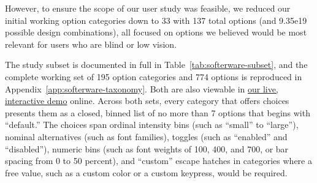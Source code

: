 \documentclass[12pt]{cmuthesis}
\begin{document}
However, to ensure the scope of our user study was feasible, we reduced our initial working option categories down to 33 with 137 total options (and 9.35e19 possible design combinations), all focused on options we believed would be most relevant for users who are blind or low vision.

The study subset is documented in full in Table~\ref{tab:softerware-subset}, and the complete working set of 195 option categories and 774 options is reproduced in Appendix~\ref{app:softerware-taxonomy}. Both are also viewable in \href{https://highcharts.github.io/highcharts-a11y-prototyping/early_explo/examples/menu/menu.html}{our live, interactive demo} online. Across both sets, every category that offers choices presents them as a closed, binned list of no more than 7 options that begins with ``default.'' The choices span ordinal intensity bins (such as ``small'' to ``large''), nominal alternatives (such as font families), toggles (such as ``enabled'' and ``disabled''), numeric bins (such as font weights of 100, 400, and 700, or bar spacing from 0 to 50 percent), and ``custom'' escape hatches in categories where a free value, such as a custom color or a custom keypress, would be required.
\end{document}
